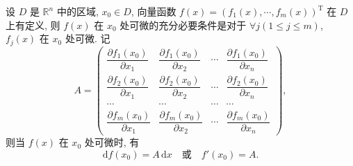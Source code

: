 \documentclass[12pt,fontset=fandol]{ctexart}
\begin{document}
\begin{theorem}\label{course-theorem-14-1-4}\quad 设 $D$ 是 $\mathbb R^n$ 中的区域, $x_0\in D$, 向量函数 $f(x)=(f_1(x),\cdots,f_m(x))^\mathrm T$ 在 $D$ 上有定义, 则 $f(x)$ 在 $x_0$ 处可微的充分必要条件是对于 $\forall j(1\leqslant j\leqslant m)$, $f_j(x)$ 在 $x_0$ 处可微. 记
\[
  A=
  \begin{pmatrix}
    \dfrac{\partial f_1(x_0)}{\partial x_1}&\dfrac{\partial f_1(x_0)}{\partial x_2}&\cdots&\dfrac{\partial f_1(x_0)}{\partial x_n}\\
    \dfrac{\partial f_2(x_0)}{\partial x_1}&\dfrac{\partial f_2(x_0)}{\partial x_2}&\cdots&\dfrac{\partial f_2(x_0)}{\partial x_n}\\
    \cdots&\cdots&\cdots&\cdots\\
    \dfrac{\partial f_m(x_0)}{\partial x_1}&\dfrac{\partial f_m(x_0)}{\partial x_2}&\cdots&\dfrac{\partial f_m(x_0)}{\partial x_n}
  \end{pmatrix},
\]
则当 $f(x)$ 在 $x_0$ 处可微时, 有
\[
  \mathrm df(x_0)=A\,\mathrm dx\quad\text{或}\quad f'(x_0)=A.
\]

\end{theorem}
\end{document}
